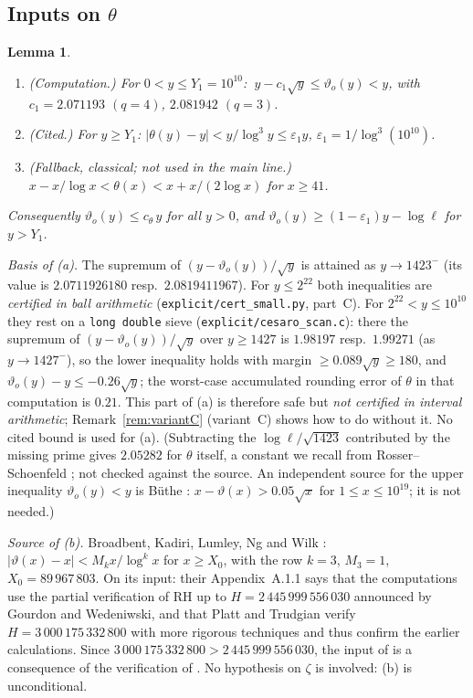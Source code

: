 \documentclass[11pt]{amsart}
\newtheorem{lemma}[theorem]{Lemma}
\theoremstyle{definition}
\numberwithin{equation}{section}
\newcommand{\eps}{\varepsilon}
\newcommand{\vth}{\vartheta_{o}}      %
\begin{document}
\subsection{Inputs on \texorpdfstring{$\theta$}{theta}}

\begin{lemma}\label{lem:theta}
\begin{enumerate}
\item[(a)] \emph{(Computation.)} For $0<y\le Y_1=10^{10}$:
$\ y-c_1\sqrt y\le\vth(y)<y$, with $c_1=2.071193$ $(q=4)$,
$2.081942$ $(q=3)$.
\item[(b)] \emph{(Cited.)} For $y\ge Y_1$:
$|\theta(y)-y|<y/\log^3y\le\eps_1y$, $\eps_1=1/\log^3(10^{10})$.
\item[(b$'$)] \emph{(Fallback, classical; not used in the main
line.)} $x-x/\log x<\theta(x)<x+x/(2\log x)$ for $x\ge41$.
\end{enumerate}
Consequently $\vth(y)\le c_\theta\,y$ for all $y>0$, and
$\vth(y)\ge(1-\eps_1)y-\log\ell$ for $y>Y_1$.
\end{lemma}

\noindent\emph{Basis of \textup{(a)}.} The supremum of
$(y-\vth(y))/\sqrt y$ is attained as $y\to1423^-$ (its value is
$2.0711926180$ resp.\ $2.0819411967$). For $y\le2^{22}$ both
inequalities are \emph{certified in ball arithmetic}
(\texttt{explicit/cert\_small.py}, part~C). For
$2^{22}<y\le10^{10}$ they rest on a \texttt{long double} sieve
(\texttt{explicit/cesaro\_scan.c}): there the supremum of
$(y-\vth(y))/\sqrt y$ over $y\ge1427$ is $1.98197$ resp.\ $1.99271$
(as $y\to1427^-$), so the lower inequality holds with margin
$\ge0.089\sqrt y\ge180$, and $\vth(y)-y\le-0.26\sqrt y$; the
worst-case accumulated rounding error of $\theta$ in that
computation is $0.21$. This part of (a) is therefore safe but
\emph{not certified in interval arithmetic};
Remark~\ref{rem:variantC} (variant~C) shows how to do without it. No
cited bound is used for (a). (Subtracting the $\log\ell/\sqrt{1423}$
contributed by the missing prime gives $2.05282$ for $\theta$ itself,
a constant we recall from Rosser--Schoenfeld \cite{RS62}; not checked
against the source. An independent source for the upper inequality
$\vth(y)<y$ is B\"uthe \cite[Theorem~2, (1.7)]{But18}:
$x-\vartheta(x)>0.05\sqrt x$ for $1\le x\le10^{19}$; it is not
needed.)

\noindent\emph{Source of \textup{(b)}.} Broadbent, Kadiri, Lumley, Ng
and Wilk \cite[Corollary~11.2, eq.~(3.39)]{BKLNW21}:
$|\vartheta(x)-x|<M_kx/\log^kx$ for $x\ge X_0$, with the row $k=3$,
$M_3=1$, $X_0=89\,967\,803$. On its input: their Appendix~A.1.1 says
that the computations use the partial verification of RH up to
$H=2\,445\,999\,556\,030$ announced by Gourdon and Wedeniwski, and
that Platt and Trudgian \cite{PT21} verify
$H=3\,000\,175\,332\,800$ with more rigorous techniques and thus
confirm the earlier calculations. Since
$3\,000\,175\,332\,800>2\,445\,999\,556\,030$, the input of
\cite{BKLNW21} is a consequence of the verification of \cite{PT21}.
No hypothesis on $\zeta$ is involved: (b) is unconditional.
\end{document}
